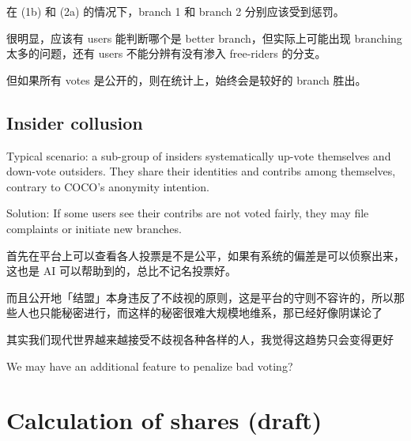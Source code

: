 \documentclass[12pt, orivec]{article}
\newcommand{\cc}[2]{#1}
\newcommand{\cc}[2]{#2}
\begin{document}
\cc{
在 (1b) 和 (2a) 的情况下，branch 1 和 branch 2 分别应该受到惩罚。
}{
In cases (1b) and (2a), branch 1 and 2 should be penalized respectively.
}

\cc{
很明显，应该有 users 能判断哪个是 better branch，但实际上可能出现 branching 太多的问题，还有 users 不能分辨有没有渗入 free-riders 的分支。 
}{
Obviously, there should exist users who can determine which branches are better, but in practice there may be too many branches to consider.  Users may be unable to tell which branches are contaminated with free-riders. 
}

\cc{
但如果所有 votes 是公开的，则在统计上，始终会是较好的 branch 胜出。 
}{
However, if all votes are openly visible, then statistically we may believe that good branches will win out eventually.	
}

\secttoc
\subsection{Insider collusion}

Typical scenario:  a sub-group of insiders systematically up-vote themselves and down-vote outsiders.  They share their identities and contribs among themselves, contrary to COCO's anonymity intention.

Solution:  If some users see their contribs are not voted fairly, they may file complaints or initiate new branches.

\cc{
首先在平台上可以查看各人投票是不是公平，如果有系统的偏差是可以侦察出来，这也是 AI 可以帮助到的，总比不记名投票好。}{
On our platform, we can examine every vote to see if they are fair.  If there is systematic bias it can be detected by people or AI algorithms.  This is definitely an improvement over secret ballot.
}

\cc{
而且公开地「结盟」本身违反了不歧视的原则，这是平台的守则不容许的，所以那些人也只能秘密进行，而这样的秘密很难大规模地维系，那已经好像阴谋论了}{
It is clearly against Coco's policy to form off-platform ``alliances'' to try to influence voting.  Such collusions can only be conducted in secret and would be hard to maintain for large numbers of people.  
}

\cc{
其实我们现代世界越来越接受不歧视各种各样的人，我觉得这趋势只会变得更好}{
	
}

We may have an additional feature to penalize bad voting?

\secttoc
\section{Calculation of shares (draft)}
\end{document}
